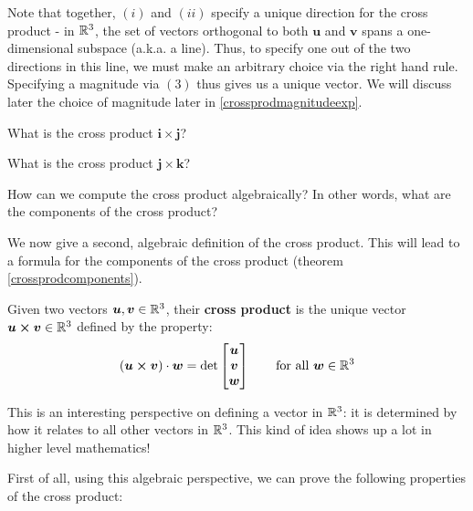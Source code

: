 Note that together, $(i)$ and $(ii)$ specify a unique direction for the cross product - in $\mathbb{R}^3$, the set of vectors orthogonal to both $\bm{u}$ and $\bm{v}$ spans a one-dimensional subspace (a.k.a. a line).  Thus, to specify one out of the two directions in this line, we must make an arbitrary choice via the right hand rule.  Specifying a magnitude via $(3)$ thus gives us a unique vector.  We will discuss later the choice of magnitude later in \ref{crossprodmagnitudeexp}.

\begin{example}
    What is the cross product $\bm{i} \times \bm{j}$?
\end{example}

\begin{example}
    What is the cross product $\bm{j} \times \bm{k}$?
\end{example}

\begin{motivating}
How can we compute the cross product algebraically?  In other words, what are the components of the cross product?
\end{motivating}

We now give a second, algebraic definition of the cross product.  This will lead to a formula for the components of the cross product (theorem \ref{crossprodcomponents}).


\begin{definition}\label{crossproddet}
    Given two vectors $\bm{u}, \bm{v} \in \mathbb{R}^3$, their \textbf{cross product} is the \textnormal{unique} vector $\bm{u \times v} \in \mathbb{R}^3$ defined by the property:
    \begin{equation*}
(\bm{u \times v}) \cdot \bm{w} = \textnormal{det}
\begin{bmatrix}
\bm{u}\\
    \bm{v}  \\
    \bm{w}
\end{bmatrix} \qquad \textnormal{for all } \bm{w} \in \mathbb{R}^3
\end{equation*}
    
    \end{definition}

This is an interesting perspective on defining a vector in $\mathbb{R}^3$: it is determined by how it relates to all other vectors in $\mathbb{R}^3$.  This kind of idea shows up a lot in higher level mathematics!

First of all, using this algebraic perspective, we can prove the following properties of the cross product: 

